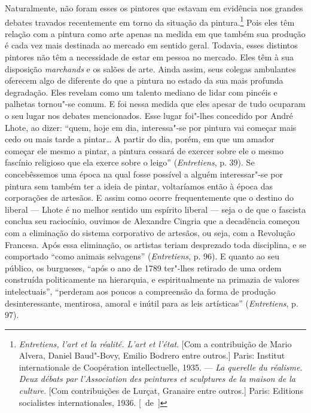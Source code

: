 Naturalmente, não foram esses os pintores que estavam em evidência nos
grandes debates travados recentemente em torno da situação da
pintura.\footnote{\emph{Entretiens, l'art et la réalité. L'art et
  l'état}. {[}Com a contribuição de Mario Alvera, Daniel Baud"-Bovy,
  Emilio Bodrero entre outros.{]} Paris: Institut internationale de
  Coopération intellectuelle, 1935. --- \emph{La querelle du réalisme.
  Deux débats par l'Association des peintures et sculptures de la maison
  de la culture}. {[}Com contribuições de Lurçat, Granaire entre
  outros.{]} Paris: Editions socialistes internationales, 1936. [~de~]} Pois eles
têm relação com a pintura como arte apenas na medida em
que também sua produção é cada vez mais destinada ao mercado em sentido
geral. Todavia, esses distintos pintores não têm a necessidade de estar
em pessoa no mercado. Eles têm à sua disposição \emph{marchands} e os
salões de arte. Ainda assim, seus colegas ambulantes oferecem algo de
diferente do que a pintura no estado da sua mais profunda degradação.
Eles revelam como um talento mediano de lidar com pincéis e palhetas
tornou"-se comum. E foi nessa medida que eles apesar de tudo ocuparam o seu
lugar nos debates mencionados. Esse lugar foi"-lhes concedido por André
Lhote, ao dizer: ``quem, hoje em dia, interessa"-se por pintura vai começar
mais cedo ou mais tarde a pintar\ldots{} A partir do dia, porém, em que um
amador começar ele mesmo a pintar, a pintura cessará de exercer sobre ele o
mesmo fascínio religioso que ela exerce sobre o leigo''
(\emph{Entretiens}, p. 39). Se concebêssemos uma época na qual fosse
possível a alguém interessar"-se por pintura sem também ter a ideia de pintar, voltaríamos então à época das corporações de
artesãos. E assim como ocorre frequentemente que o destino do liberal --- Lhote é
no melhor sentido um espírito liberal --- seja o de que o fascista conclua seu
raciocínio, ouvimos de Alexandre Cingria que a decadência começou com a
eliminação do sistema corporativo de artesãos, ou seja, com a Revolução
Francesa. Após essa eliminação, os artistas teriam desprezado toda
disciplina, e se comportado ``como animais selvagens''
(\emph{Entretiens}, p. 96). E quanto ao seu público, os burgueses,
``após o ano de 1789 ter"-lhes retirado de uma ordem construída
politicamente na hierarquia, e espiritualmente na primazia de valores
intelectuais'', ``perderam aos poucos a compreensão da forma de produção
desinteressante, mentirosa, amoral e inútil para as leis artísticas'' (\emph{Entretiens}, p. 97).


